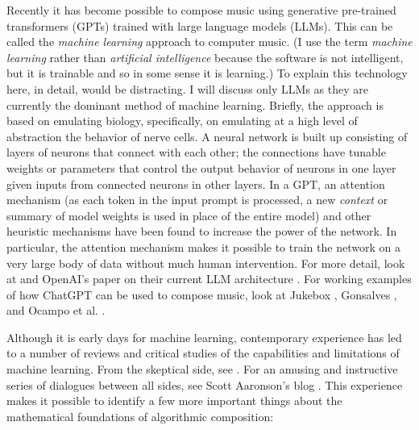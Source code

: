 \documentclass[11pt]{scrartcl}
\begin{document}
Recently it has become possible to compose music using generative pre-trained transformers (GPTs) trained with large language models (LLMs). This can be called the \emph{machine learning} approach to computer music. (I use the term \emph{machine learning} rather than \emph{artificial intelligence} because the software is not intelligent, but it is trainable and so in some sense it is learning.) To explain this technology here, in detail, would be distracting. I will discuss only LLMs as they are currently the dominant method of machine learning. Briefly, the approach is based on emulating biology, specifically, on emulating at a high level of abstraction the behavior of nerve cells. A neural network is built up consisting of layers of neurons that connect with each other; the connections have tunable weights or parameters that control the output behavior of neurons in one layer given inputs from connected neurons in other layers. In a GPT, an attention mechanism (as each token in the input prompt is processed, a new \emph{context} or summary of model weights is used in place of the entire model) and other heuristic mechanisms have been found to increase the power of the network. In particular, the attention mechanism makes it possible to train the network on a very large body of data without much human intervention. For more detail, look at \cite{zhang2023complete} and OpenAI's paper on their current LLM architecture \cite{openai2023gpt4}. For working examples of how ChatGPT can be used to compose music, look at Jukebox \cite{openai2023jukebox}, Gonsalves \cite{aitunes}, and Ocampo et al. \cite{ocampo2023using}.

Although it is early days for machine learning, contemporary experience has led to a number of reviews and critical studies of the capabilities and limitations of machine learning. From the skeptical side, see \cite{dale2021gpt}. For an amusing and instructive series of dialogues between all sides, see Scott Aaronson's blog \cite{shtetl}. This experience makes it possible to identify a few more important things about the mathematical foundations of algorithmic composition:
\end{document}
